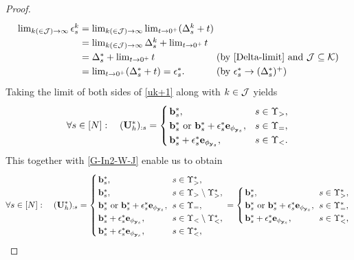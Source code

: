 \documentclass[journal]{IEEEtran}
\def\U{{\bf U}}
\def\b{{\bf b}}
\def\e{{\bf e}}
\def\y{{\bf y}}
\begin{document}
\begin{proof}
\begin{eqnarray*}
 \arraycolsep=1.4pt\def\arraystretch{1.25} \begin{array}{llll}
\lim_{k(\in{\cal J})\to\infty}\epsilon_s^k &=& \lim_{k(\in{\cal J})\to\infty}  \lim_{t\to 0^+}  (\Delta_s^k + t)\\
&=& \lim_{k(\in{\cal J})\to\infty} \Delta_s^k+ \lim_{t\to 0^+}   t \\
&=& \Delta_s^*+ \lim_{t\to 0^+}   t&(\text{by \eqref{Delta-limit} and ${\cal J}\subseteq {\cal K}$})\\
& =&  \lim_{t\to 0^+} (\Delta_s^*+  t) = \epsilon_s^*. &(\text{by  $\epsilon_s^*\to (\Delta_s^*)^+$})\\
\end{array}
\end{eqnarray*}
Taking the limit of both sides of \eqref{uk+1} along with $k\in\cal J$ yields
\begin{eqnarray*}
 \arraycolsep=1.4pt\def\arraystretch{1.25}
\forall s\in[N]:~~~(\U_h^*)_{:s}=  \left\{\begin{array}{lll}
\b^*_s, &  s\in \Upsilon_>,\\
\b^*_s~ \text{or}~\b^*_s+\epsilon_s^* \e_{\phi_{\y_s}}, ~~&  s\in \Upsilon_=,\\
 \b^*_s+\epsilon_s^* \e_{{\phi_{\y_s}}}, &  s\in \Upsilon_<.
\end{array}\right.
\end{eqnarray*}
This together with \eqref{G-In2-W-J} enable us to obtain
\begin{eqnarray*}
 \arraycolsep=1.4pt\def\arraystretch{1.25}
\forall s\in[N]:~~~(\U_h^*)_{:s}=  \left\{\begin{array}{lll}
\b^*_s, &  s\in \Upsilon_>^*,\\
 \b^*_s, &  s\in \Upsilon_> \setminus \Upsilon_>^*,\\
\b^*_s~ \text{or}~\b^*_s+\epsilon_s^* \e_{\phi_{\y_s}}, ~&  s\in \Upsilon_=,\\
 \b^*_s+ \epsilon_s^* \e_{{\phi_{\y_s}}}, &  s\in \Upsilon_< \setminus \Upsilon_<^*,\\
 \b^*_s+\epsilon_s^* \e_{{\phi_{\y_s}}}, &  s\in \Upsilon_<^*,
\end{array}\right.=  \left\{\begin{array}{lll}
\b^*_s, &  s\in \Upsilon_>^*,\\
\b^*_s~ \text{or}~\b^*_s+\epsilon_s^* \e_{\phi_{\y_s}}, ~&  s\in \Upsilon_=^*,\\
 \b^*_s+\epsilon_s^* \e_{{\phi_{\y_s}}}, &  s\in \Upsilon_<^*,
\end{array}\right.

\end{eqnarray*}
\end{proof}
\end{document}
